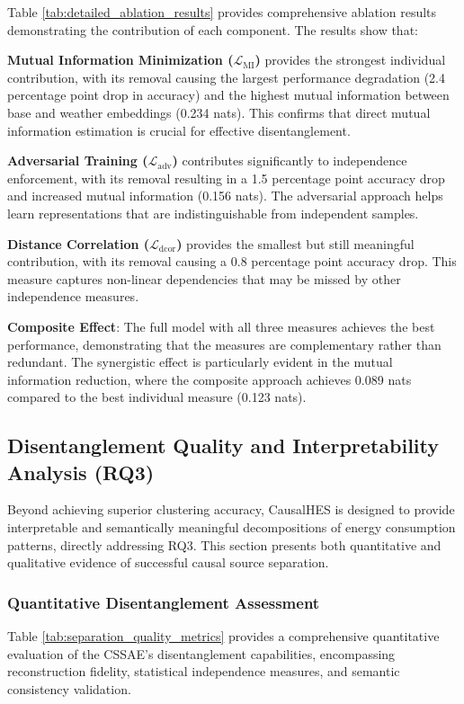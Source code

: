 \documentclass[journal]{IEEEtran}
\begin{document}
Table \ref{tab:detailed_ablation_results} provides comprehensive ablation results demonstrating the contribution of each component. The results show that:

\textbf{Mutual Information Minimization ($\mathcal{L}_{\text{MI}}$)} provides the strongest individual contribution, with its removal causing the largest performance degradation (2.4 percentage point drop in accuracy) and the highest mutual information between base and weather embeddings (0.234 nats). This confirms that direct mutual information estimation is crucial for effective disentanglement.

\textbf{Adversarial Training ($\mathcal{L}_{\text{adv}}$)} contributes significantly to independence enforcement, with its removal resulting in a 1.5 percentage point accuracy drop and increased mutual information (0.156 nats). The adversarial approach helps learn representations that are indistinguishable from independent samples.

\textbf{Distance Correlation ($\mathcal{L}_{\text{dcor}}$)} provides the smallest but still meaningful contribution, with its removal causing a 0.8 percentage point accuracy drop. This measure captures non-linear dependencies that may be missed by other independence measures.

\textbf{Composite Effect}: The full model with all three measures achieves the best performance, demonstrating that the measures are complementary rather than redundant. The synergistic effect is particularly evident in the mutual information reduction, where the composite approach achieves 0.089 nats compared to the best individual measure (0.123 nats).

\subsection{Disentanglement Quality and Interpretability Analysis (RQ3)}
\label{sec:separation_analysis}

Beyond achieving superior clustering accuracy, CausalHES is designed to provide interpretable and semantically meaningful decompositions of energy consumption patterns, directly addressing RQ3. This section presents both quantitative and qualitative evidence of successful causal source separation.

\subsubsection{Quantitative Disentanglement Assessment}
Table \ref{tab:separation_quality_metrics} provides a comprehensive quantitative evaluation of the CSSAE's disentanglement capabilities, encompassing reconstruction fidelity, statistical independence measures, and semantic consistency validation.
\end{document}
